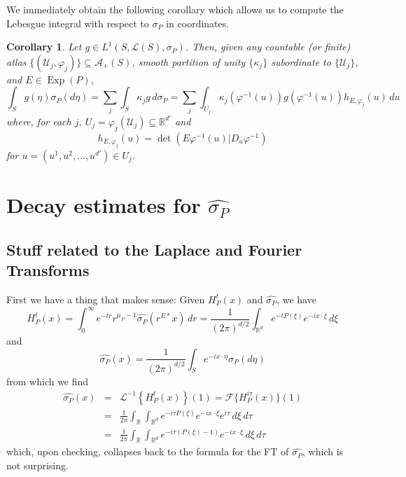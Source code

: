 \documentclass[11pt]{article}
\newtheorem{corollary}[theorem]{Corollary}
\newcommand\Exp{\operatorname{Exp}}
\renewcommand\det{\operatorname{det}}
\newcommand{\lc}{\left\{}
\newcommand{\rc}{\right\}}
\newcommand{\FT}{\mathcal{F}}
\newcommand{\LT}{\mathcal{L}}
\begin{document}
\noindent We immediately obtain the following corollary which allows us to compute the Lebesgue integral with respect to $\sigma_P$ in coordinates.
\begin{corollary}\label{cor:IntegralFormula}
Let $g\in L^1(S,\mathcal{L}(S),\sigma_P)$. Then, given any  countable (or finite) atlas $\{(\mathcal{U}_j,\varphi_j)\}\subseteq\mathcal{A}_+(S)$,  smooth partition of unity $\{\kappa_j\}$ subordinate to $\{\mathcal{U}_j\}$, and $E\in\Exp(P)$,
\begin{equation*}
\int_S g(\eta)\sigma_P(d\eta)=\sum_{j}\int_S \kappa_jg\,d\sigma_P=\sum_j\int_{U_j}\kappa_j(\varphi^{-1}(u))g(\varphi^{-1}(u))h_{E,\varphi_j}(u)\,du
\end{equation*}
where, for each $j$, $U_j=\varphi_j(\mathcal{U}_j)\subseteq\mathbb{R}^{d'}$ and
\begin{equation*}
    h_{E,\varphi_j}(u)=\det(E\varphi^{-1}(u)\vert D_u\varphi^{-1})
\end{equation*}
for $u=(u^1,u^2,\dots,u^{d'})\in U_j$. 
\end{corollary}


\section{Decay estimates for $\widehat{\sigma_P}$}



\subsection{Stuff related to the Laplace and Fourier Transforms}


First we have a thing that makes sense: Given $H_P^t(x)$ and $\widehat{\sigma_P}$, we have
\begin{equation*}
    H_P^t(x)=\int_0^\infty e^{-tr}r^{\mu_P-1}\widehat{\sigma_P}(r^{E*}x)\,dr = \frac{1}{(2\pi)^{d/2}}\int_{\mathbb{R}^d}e^{-tP(\xi)}e^{-ix\cdot \xi}\,d\xi
\end{equation*}
and
\begin{equation*}
    \widehat{\sigma_P}(x)=\frac{1}{(2\pi)^{d/2}}\int_S e^{-ix\cdot\eta}\sigma_P(d\eta)
\end{equation*}
from which we find
\begin{eqnarray*}
    \widehat{\sigma_P}(x) 
    &=& \LT^{-1}\lc H^t_P(x)\rc (1) = \FT\{ H_{P}^{i\tau}(x) \}(1) \\
    &=&\frac{1}{2\pi}\int_\mathbb{R}\int_{\mathbb{R}^d}e^{-i\tau P(\xi)}e^{-ix\cdot \xi} e^{i\tau}\,d\xi\,d\tau \\
    &=& \frac{1}{2\pi}\int_\mathbb{R}\int_{\mathbb{R}^d}e^{-i\tau (P(\xi)-1)}e^{-ix\cdot \xi} \,d\xi\,d\tau
\end{eqnarray*}
which, upon checking, collapses back to the formula for the FT of $\widehat{\sigma_P}$, which is not surprising. \\
\end{document}
